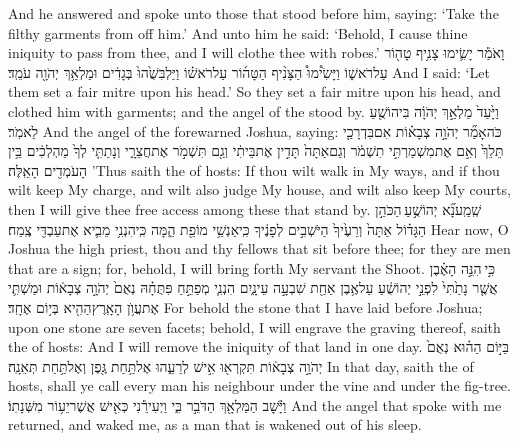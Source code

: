 {And he answered and spoke unto those that stood before him, saying: ‘Take the filthy garments from off him.’ And unto him he said: ‘Behold, I cause thine iniquity to pass from thee, and I will clothe thee with robes.’}
{וָאֹמַ֕ר יָשִׂ֛ימוּ צָנִ֥יף טָה֖וֹר עַל\maqqaf רֹאשׁ֑וֹ וַיָּשִׂ֩ימוּ֩ הַצָּנִ֨יף הַטָּה֜וֹר עַל\maqqaf רֹאשׁ֗וֹ וַיַּלְבִּשֻׁ֙הוּ֙ בְּגָדִ֔ים וּמַלְאַ֥ךְ יְהֹוָ֖ה עֹמֵֽד׃}
{And I said: ‘Let them set a fair mitre upon his head.’ So they set a fair mitre upon his head, and clothed him with garments; and the angel of the \lord\space stood by.}
{וַיָּ֙עַד֙ מַלְאַ֣ךְ יְהֹוָ֔ה בִּיהוֹשֻׁ֖עַ לֵאמֹֽר׃}
{And the angel of the \lord\space forewarned Joshua, saying:}
{כֹּה\maqqaf אָמַ֞ר יְהֹוָ֣ה צְבָא֗וֹת אִם\maqqaf בִּדְרָכַ֤י תֵּלֵךְ֙ וְאִ֣ם אֶת\maqqaf מִשְׁמַרְתִּ֣י תִשְׁמֹ֔ר וְגַם\maqqaf אַתָּה֙ תָּדִ֣ין אֶת\maqqaf בֵּיתִ֔י וְגַ֖ם תִּשְׁמֹ֣ר אֶת\maqqaf חֲצֵרָ֑י וְנָתַתִּ֤י לְךָ֙ מַהְלְכִ֔ים בֵּ֥ין הָעֹמְדִ֖ים הָאֵֽלֶּה׃}
{’Thus saith the \lord\space of hosts: If thou wilt walk in My ways, and if thou wilt keep My charge, and wilt also judge My house, and wilt also keep My courts, then I will give thee free access among these that stand by.}
{שְֽׁמַֽע\maqqaf נָ֞א יְהוֹשֻׁ֣עַ \legarmeh  הַכֹּהֵ֣ן הַגָּד֗וֹל אַתָּה֙ וְרֵעֶ֙יךָ֙ הַיֹּשְׁבִ֣ים לְפָנֶ֔יךָ כִּֽי\maqqaf אַנְשֵׁ֥י מוֹפֵ֖ת הֵ֑מָּה כִּֽי\maqqaf הִנְנִ֥י מֵבִ֛יא אֶת\maqqaf עַבְדִּ֖י צֶֽמַח׃}
{Hear now, O Joshua the high priest, thou and thy fellows that sit before thee; for they are men that are a sign; for, behold, I will bring forth My servant the Shoot.}
{כִּ֣י \legarmeh  הִנֵּ֣ה הָאֶ֗בֶן אֲשֶׁ֤ר נָתַ֙תִּי֙ לִפְנֵ֣י יְהוֹשֻׁ֔עַ עַל\maqqaf אֶ֥בֶן אַחַ֖ת שִׁבְעָ֣ה עֵינָ֑יִם הִנְנִ֧י מְפַתֵּ֣חַ פִּתֻּחָ֗הּ נְאֻם֙ יְהֹוָ֣ה צְבָא֔וֹת וּמַשְׁתִּ֛י אֶת\maqqaf עֲוֺ֥ן הָאָֽרֶץ\maqqaf הַהִ֖יא בְּי֥וֹם אֶחָֽד׃}
{For behold the stone that I have laid before Joshua; upon one stone are seven facets; behold, I will engrave the graving thereof, saith the \lord\space of hosts: And I will remove the iniquity of that land in one day.}
{בַּיּ֣וֹם הַה֗וּא נְאֻם֙ יְהֹוָ֣ה צְבָא֔וֹת תִּקְרְא֖וּ אִ֣ישׁ לְרֵעֵ֑הוּ אֶל\maqqaf תַּ֥חַת גֶּ֖פֶן וְאֶל\maqqaf תַּ֥חַת תְּאֵנָֽה׃}
{In that day, saith the \lord\space of hosts, shall ye call every man his neighbour under the vine and under the fig-tree.}
\newperek
{}
{וַיָּ֕שׇׁב הַמַּלְאָ֖ךְ הַדֹּבֵ֣ר בִּ֑י וַיְעִירֵ֕נִי כְּאִ֖ישׁ אֲשֶׁר\maqqaf יֵע֥וֹר מִשְּׁנָתֽוֹ׃}
{And the angel that spoke with me returned, and waked me, as a man that is wakened out of his sleep.}
